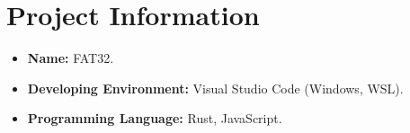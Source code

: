 \section{Project Information}
\begin{itemize}
  \item \textbf{Name:} FAT32.
  \item \textbf{Developing Environment:} Visual Studio Code (Windows, WSL).
  \item \textbf{Programming Language:} Rust, JavaScript.
\end{itemize}
